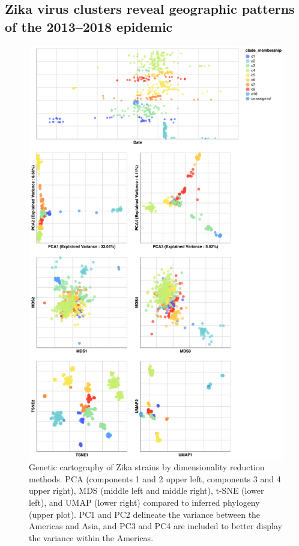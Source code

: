 \documentclass[9pt,lineno]{elife}
\begin{document}
\subsection*{Zika virus clusters reveal geographic patterns of the 2013--2018 epidemic}

\begin{figure}[htb]
  \begin{center}
  \includegraphics[width=\columnwidth]{zika-embeddings}
  \caption{
    Genetic cartography of Zika strains by dimensionality reduction methods.
    PCA (components 1 and 2 upper left, components 3 and 4 upper right), MDS (middle left and middle right), t-SNE (lower left), and UMAP (lower right) compared to inferred phylogeny (upper plot).
    PC1 and PC2 delineate the variance between the Americas and Asia, and PC3 and PC4 are included to better display the variance within the Americas.
  }
  \label{fig:zika-embeddings}
  \end{center}
\end{figure}
\end{document}
